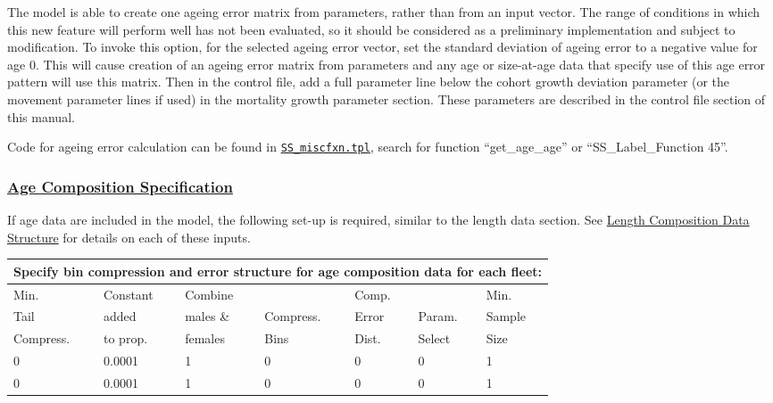 The model is able to create one ageing error matrix from parameters, rather than from an input vector. The range of conditions in which this new feature will perform well has not been evaluated, so it should be considered as a preliminary implementation and subject to modification. To invoke this option, for the selected ageing error vector, set the standard deviation of ageing error to a negative value for age 0. This will cause creation of an ageing error matrix from parameters and any age or size-at-age data that specify use of this age error pattern will use this matrix. Then in the control file, add a full parameter line below the cohort growth deviation parameter (or the movement parameter lines if used) in the mortality growth parameter section. These parameters are described in the control file section of this manual.

Code for ageing error calculation can be found in \href{https://github.com/nmfs-ost/ss3-source-code/blob/main/SS_miscfxn.tpl}{\texttt{SS\_miscfxn.tpl}}, search for function ``get\_age\_age'' or ``SS\_Label\_Function 45''.

\hypertarget{AgeCompSpec}{}
\subsubsection[Age Composition Specification]{\protect\hyperlink{AgeCompSpec}{Age Composition Specification}}
If age data are included in the model, the following set-up is required, similar to the length data section. See \hyperlink{length-comp-structure}{Length Composition Data Structure} for details on each of these inputs.

\begin{tabular}{p{2cm} p{2cm} p{2cm} p{1.5cm} p{1.5cm} p{2cm} p{2cm}}
	\multicolumn{7}{l}{Specify bin compression and error structure for age composition data for each fleet:} \\
	\hline
	Min.      & Constant & Combine  &           & Comp. &        & Min. \Tstrut\\
	Tail      & added    & males \& & Compress. & Error & Param. & Sample \\
	Compress. & to prop. & females  & Bins      & Dist. & Select & Size \Bstrut\\
	\hline
	0 & 0.0001 & 1 & 0 & 0 & 0 & 1 \Tstrut\\
	0 & 0.0001 & 1 & 0 & 0 & 0 & 1 \Bstrut\\
	\hline
\end{tabular}

